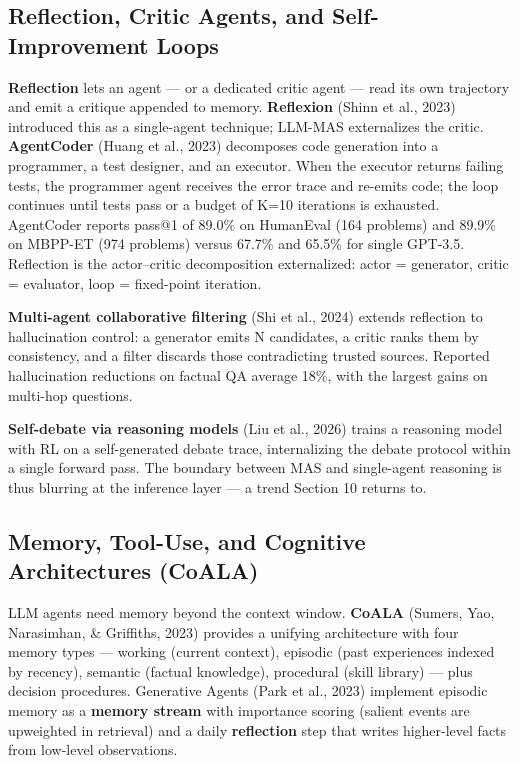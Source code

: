 \subsection{Reflection, Critic Agents, and Self-Improvement Loops}\label{reflection-critic-agents-and-self-improvement-loops}

\textbf{Reflection} lets an agent --- or a dedicated critic agent --- read its own trajectory and emit a critique appended to memory. \textbf{Reflexion} (Shinn et al., 2023) introduced this as a single-agent technique; LLM-MAS externalizes the critic. \textbf{AgentCoder} (Huang et al., 2023) decomposes code generation into a programmer, a test designer, and an executor. When the executor returns failing tests, the programmer agent receives the error trace and re-emits code; the loop continues until tests pass or a budget of K=10 iterations is exhausted. AgentCoder reports pass@1 of 89.0\% on HumanEval (164 problems) and 89.9\% on MBPP-ET (974 problems) versus 67.7\% and 65.5\% for single GPT-3.5. Reflection is the actor--critic decomposition externalized: actor = generator, critic = evaluator, loop = fixed-point iteration.

\textbf{Multi-agent collaborative filtering} (Shi et al., 2024) extends reflection to hallucination control: a generator emits N candidates, a critic ranks them by consistency, and a filter discards those contradicting trusted sources. Reported hallucination reductions on factual QA average 18\%, with the largest gains on multi-hop questions.

\textbf{Self-debate via reasoning models} (Liu et al., 2026) trains a reasoning model with RL on a self-generated debate trace, internalizing the debate protocol within a single forward pass. The boundary between MAS and single-agent reasoning is thus blurring at the inference layer --- a trend Section 10 returns to.

\subsection{Memory, Tool-Use, and Cognitive Architectures (CoALA)}\label{memory-tool-use-and-cognitive-architectures-coala}

LLM agents need memory beyond the context window. \textbf{CoALA} (Sumers, Yao, Narasimhan, \& Griffiths, 2023) provides a unifying architecture with four memory types --- working (current context), episodic (past experiences indexed by recency), semantic (factual knowledge), procedural (skill library) --- plus decision procedures. Generative Agents (Park et al., 2023) implement episodic memory as a \textbf{memory stream} with importance scoring (salient events are upweighted in retrieval) and a daily \textbf{reflection} step that writes higher-level facts from low-level observations.

